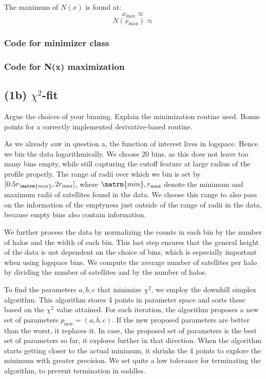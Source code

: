 \documentclass{article}
\newcommand{\CodeDir}{Code}
\newcommand{\CalcDir}{Calculations}
\begin{document}
The maximum of \(N(x)\) is found at:
$$x_{\text{max}} \approx   $$
$$N(x_{\text{max}}) \approx   $$

\subsubsection{Code for minimizer class}


\subsubsection{Code for N(x) maximization}








\subsection{(1b) $\chi^2$-fit}

Argue the choices of your binning. Explain the minimization routine used. Bonus points for a correctly implemented derivative-based routine.

As we already saw in question a, the function of interest lives in logspace. Hence we bin the data logarithmically.
We choose 20 bins, as this does not leave too many bins empty, 
while still capturing the cutoff feature at large radius of the profile properly.
The range of radii over which we bin is set by $[0.5r_\matrm{min}, 2r_\mathrm{max}]$,
where $\matrm{min}, r_\mathrm{max}$ denote the minimum and maximum radii of satellites found in the data. 
We choose this range to also pass on the information of the emptyness just outside of the range of radii in the data,
because empty bins also contain information. 

We further process the data by normalizing the counts in each bin by the number of halos
and the width of each bin. 
This last step ensures that the general height of the data is not dependent on the choice of bins,
which is especially important when using logspace bins.
We compute the average number of satellites per halo by dividing the number of satellites and by the number of halos.

To find the parameters $a,b,c$ that minimize $\chi^2$, we employ the downhill simplex algorithm.
This algorithm stores 4 points in parameter space and sorts these based on the $\chi^2$ value attained.
For each iteration, the algorithm proposes a new set of parameters $p_\mathrm{new} = (a, b, c)$.
If the new proposed parameters are better than the worst, it replaces it. In case,
the proposed set of parameters is the best set of parameters so far, it explores further in that direction.
When the algorithm starts getting closer to the actual minimum, it shrinks the 4 points to 
explore the minimum with greater precision.
We set quite a low tolerance for terminating the algorithm, to prevent termination 
in saddles. 
\end{document}
